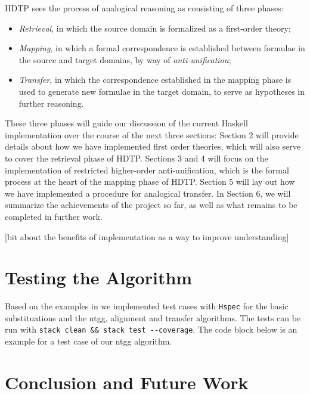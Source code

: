 \documentclass[12pt,a4paper]{article}
\begin{document}
HDTP sees the process of analogical reasoning as consisting of three phases: 
\begin{itemize}
    \item \textit{Retrieval}, in which the source domain is formalized as a first-order theory;
    \item \textit{Mapping}, in which a formal correspondence is established between formulae in the source and target domains, by way of \textit{anti-unification};
    \item \textit{Transfer}, in which the correspondence established in the mapping phase is used to generate new formulae in the target domain, to serve as hypotheses in further reasoning.
\end{itemize} 

These three phases will guide our discussion of the current Haskell implementation over the course of the next three sections: Section 2 will provide details about how we have implemented first order theories, which will also serve to cover the retrieval phase of HDTP. Sections 3 and 4 will focus on the implementation of restricted higher-order anti-unification, which is the formal process at the heart of the mapping phase of HDTP. Section 5 will lay out how we have implemented a procedure for analogical transfer. In Section 6, we will summarize the achievements of the project so far, as well as what remains to be completed in further work.
% 

[bit about the benefits of implementation as a way to improve understanding]



\section{Testing the Algorithm}

Based on the examples in \cite{Schmidt-2014} we implemented test cases with \texttt{Hspec} for the basic substituations and the ntgg, alignment and transfer algorithms. The tests can be run with \verb|stack clean && stack test --coverage|. The code block below is an example for a test case of our ntgg algorithm.

\vspace{0.5cm}



\section{Conclusion and Future Work}
% 





\end{document}
